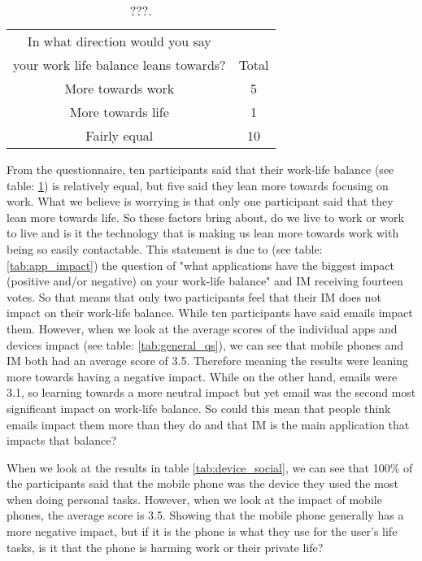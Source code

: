 \documentclass{sigchi}
\begin{document}
	\begin{table}[ht]
		\centering
		\begin{tabular}[t]{ |c| c | }
			\hline
			In what direction would you say & \\
			your work life balance leans towards? & Total  \\ 
			\hline
			More towards work & 5 \\ 
			\hline
			More towards life & 1  \\ 
			\hline
			Fairly equal &  10 \\
			\hline
		\end{tabular}
		\caption{???.}
		\label{tab:work_life_swing}
	\end{table}%
	
	From the questionnaire, ten participants said that their work-life balance (see table: \ref{tab:work_life_swing}) is relatively equal, but five said they lean more towards focusing on work. What we believe is worrying is that only one participant said that they lean more towards life. So these factors bring about, do we live to work or work to live and is it the technology that is making us lean more towards work with being so easily contactable. This statement is due to (see table: \ref{tab:app_impact}) the question of "what applications have the biggest impact (positive and/or negative) on your work-life balance" and IM receiving fourteen votes. So that means that only two participants feel that their IM does not impact on their work-life balance. While ten participants have said emails impact them. However, when we look at the average scores of the individual apps and devices impact (see table: \ref{tab:general_qs}), we can see that mobile phones and IM both had an average score of 3.5. Therefore meaning the results were leaning more towards having a negative impact. While on the other hand, emails were 3.1, so learning towards a more neutral impact but yet email was the second most significant impact on work-life balance. So could this mean that people think emails impact them more than they do and that IM is the main application that impacts that balance?




When we look at the results in table \ref{tab:device_social}, we can see that 100\% of the participants said that the mobile phone was the device they used the most when doing personal tasks. However, when we look at the impact of mobile phones, the average score is 3.5. Showing that the mobile phone generally has a more negative impact, but if it is the phone is what they use for the user's life tasks, is it that the phone is harming work or their private life? 
\end{document}
